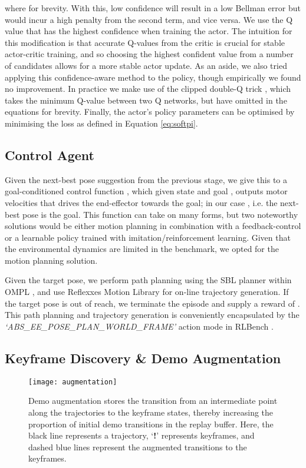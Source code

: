 \documentclass[letterpaper, 10 pt, journal, twoside]{IEEEtran}
\begin{document}
where  for brevity. With this, low confidence will result in a low Bellman error but would incur a high penalty from the second term, and vice versa. We use the Q value that has the highest confidence when training the actor. The intuition for this modification is that accurate Q-values from the critic is crucial for stable actor-critic training, and so choosing the highest confident value from a number of candidates allows for a more stable actor update. As an aside, we also tried applying this confidence-aware method to the policy, though empirically we found no improvement. In practice we make use of the clipped double-Q trick \cite{fujimoto2018addressing}, which takes the minimum Q-value between two Q networks, but have omitted in the equations for brevity. Finally, the actor's policy parameters can be optimised by minimising the loss as defined in Equation \ref{eq:softpi}.

\subsection{Control Agent}
\label{sec:phase3}

Given the next-best pose suggestion from the previous stage, we give this to a goal-conditioned control function , which given state  and goal , outputs motor velocities that drives the end-effector towards the goal; in our case , i.e. the next-best pose is the goal. This function can take on many forms, but two noteworthy solutions would be either motion planning in combination with a feedback-control or a learnable policy trained with imitation/reinforcement learning. Given that the environmental dynamics are limited in the benchmark, we opted for the motion planning solution.

Given the target pose, we perform path planning using the SBL \cite{sanchez2003single} planner within OMPL \cite{sucan2012ompl}, and use Reflexxes Motion Library for on-line trajectory generation. If the target pose is out of reach, we terminate the episode and supply a reward of . This path planning and trajectory generation is conveniently encapsulated by the \textit{`ABS\_EE\_POSE\_PLAN\_WORLD\_FRAME'} action mode in RLBench \cite{james2019rlbench}.

\subsection{Keyframe Discovery \& Demo Augmentation}
\label{sec:demo_augmentation}

\begin{figure}[]
\centering
\texttt{[image: augmentation]}
\caption{Demo augmentation stores the transition from an intermediate point along the trajectories to the keyframe states, thereby increasing the proportion of initial demo transitions in the replay buffer. Here, the black line represents a trajectory, `\textbf{!}' represents keyframes, and dashed blue lines represent the augmented transitions to the keyframes.}
\label{fig:augmentation}
\end{figure}
\end{document}

